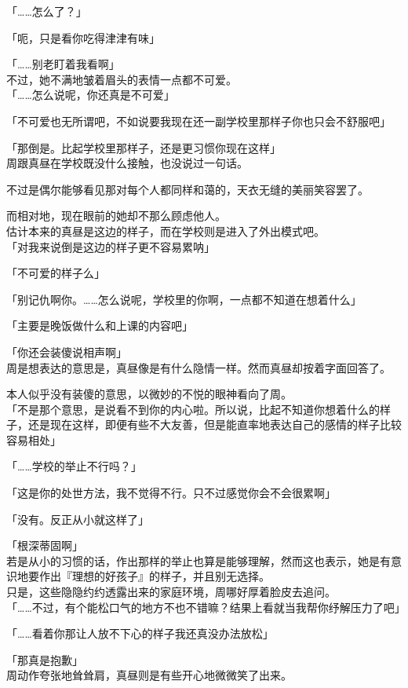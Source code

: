 「……怎么了？」

「呃，只是看你吃得津津有味」

「……别老盯着我看啊」\\

不过，她不满地皱着眉头的表情一点都不可爱。\\

「……怎么说呢，你还真是不可爱」

「不可爱也无所谓吧，不如说要我现在还一副学校里那样子你也只会不舒服吧」

「那倒是。比起学校里那样子，还是更习惯你现在这样」\\

周跟真昼在学校既没什么接触，也没说过一句话。

不过是偶尔能够看见那对每个人都同样和蔼的，天衣无缝的美丽笑容罢了。

而相对地，现在眼前的她却不那么顾虑他人。\\

估计本来的真昼是这边的样子，而在学校则是进入了外出模式吧。\\

「对我来说倒是这边的样子更不容易累呐」

「不可爱的样子么」

「别记仇啊你。……怎么说呢，学校里的你啊，一点都不知道在想着什么」

「主要是晚饭做什么和上课的内容吧」

「你还会装傻说相声啊」\\

周是想表达的意思是，真昼像是有什么隐情一样。然而真昼却按着字面回答了。

本人似乎没有装傻的意思，以微妙的不悦的眼神看向了周。\\

「不是那个意思，是说看不到你的内心啦。所以说，比起不知道你想着什么的样子，还是现在这样，即便有些不大友善，但是能直率地表达自己的感情的样子比较容易相处」

「……学校的举止不行吗？」

「这是你的处世方法，我不觉得不行。只不过感觉你会不会很累啊」

「没有。反正从小就这样了」

「根深蒂固啊」\\

若是从小的习惯的话，作出那样的举止也算是能够理解，然而这也表示，她是有意识地要作出『理想的好孩子』的样子，并且别无选择。\\

只是，这些隐隐约约透露出来的家庭环境，周哪好厚着脸皮去追问。\\

「……不过，有个能松口气的地方不也不错嘛？结果上看就当我帮你纾解压力了吧」

「……看着你那让人放不下心的样子我还真没办法放松」

「那真是抱歉」\\

周动作夸张地耸耸肩，真昼则是有些开心地微微笑了出来。
